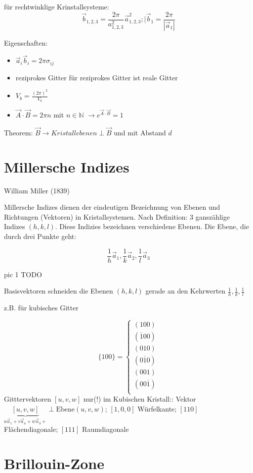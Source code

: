für rechtwinklige Krinstallsysteme: 
\[\vec b_{1,2,3}=\frac {2\pi}{a^2_{1,2,3}}\vec a^2_{1,2,3}; |\vec b_1=
\frac{2\pi}{|\vec a_1|}\]

Eigenschaften: 

\begin{itemize}
\item \(\vec a_i\vec b_i=2\pi\sigma_{ij}\)
\item reziprokes Gitter für reziprokes Gitter ist reale Gitter
\item \(V_b=\frac {(2\pi)^3}{V_a}\)
\item \(\vec A\cdot\vec B = 2\pi n\) mit \(n\in \mathbb N\) \(\rightarrow e^{\vec A\cdot\vec B }=1\)
\end{itemize}

Theorem: \(\vec B \rightarrow Kristallebenen  \perp \vec B\) und mit Abstand \(d\)


\section{Millersche Indizes}
William Miller (1839)

Millersche Indizes dienen der eindeutigen Bezeichnung von Ebenen und Richtungen
(Vektoren) in Kristallsystemen. Nach Definition: 3 ganszählige Indizes
\((h,k,l)\). Diese Indizies bezeichnen verschiedene Ebenen. Die Ebene, die durch
drei Punkte geht:

\[ \frac 1 h\vec a_1, \frac 1 k\vec a_2, \frac 1 l\vec a_3\]

pic 1 TODO

Basisvektoren schneiden die Ebenen \((h,k,l)\) gerade an den Kehrwerten \(\frac 1
h, \frac 1 k,  \frac 1 l\)

z.B. für kubisches Gitter

\[\{100\}=\begin{cases} 
(100)\\
(\overline 1 00)\\
(010)\\
(0\overline 1 0)\\
(001)\\
(00\overline 1)\\
\end{cases} 
\]
Gitttervektoren \([u,v,w]\) nur(!) im Kubischen Kristall:: Vektor
\(\underbrace{[u,v,w]}_{u\vec a_1+v\vec a_a+w\vec a_3+} \perp
\text{Ebene}(u,v,w)\); \([1,0,0]\) Würfelkante; \([110]\) Flächendiagonale; \([111]\) Raumdiagonale


\section{Brillouin-Zone}


